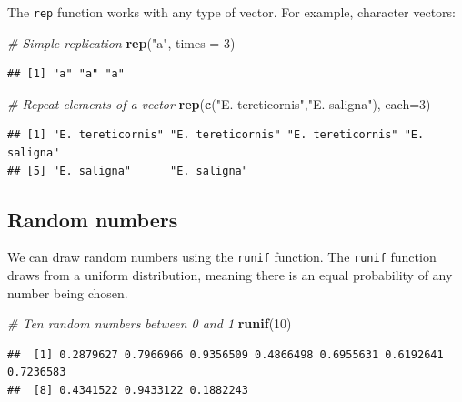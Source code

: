 \documentclass[]{book}
\newenvironment{Shaded}{\begin{snugshade}}{\end{snugshade}}
\newcommand{\CommentTok}[1]{\textcolor[rgb]{0.56,0.35,0.01}{\textit{#1}}}
\newcommand{\DataTypeTok}[1]{\textcolor[rgb]{0.13,0.29,0.53}{#1}}
\newcommand{\DecValTok}[1]{\textcolor[rgb]{0.00,0.00,0.81}{#1}}
\newcommand{\KeywordTok}[1]{\textcolor[rgb]{0.13,0.29,0.53}{\textbf{#1}}}
\newcommand{\NormalTok}[1]{#1}
\newcommand{\StringTok}[1]{\textcolor[rgb]{0.31,0.60,0.02}{#1}}
\begin{document}
The \texttt{rep} function works with any type of vector. For example, character vectors:

\begin{Shaded}
\begin{Highlighting}[]
\CommentTok{# Simple replication}
\KeywordTok{rep}\NormalTok{(}\StringTok{"a"}\NormalTok{, }\DataTypeTok{times =} \DecValTok{3}\NormalTok{)}
\end{Highlighting}
\end{Shaded}

\begin{verbatim}
## [1] "a" "a" "a"
\end{verbatim}

\begin{Shaded}
\begin{Highlighting}[]
\CommentTok{# Repeat elements of a vector}
\KeywordTok{rep}\NormalTok{(}\KeywordTok{c}\NormalTok{(}\StringTok{"E. tereticornis"}\NormalTok{,}\StringTok{"E. saligna"}\NormalTok{), }\DataTypeTok{each=}\DecValTok{3}\NormalTok{)}
\end{Highlighting}
\end{Shaded}

\begin{verbatim}
## [1] "E. tereticornis" "E. tereticornis" "E. tereticornis" "E. saligna"     
## [5] "E. saligna"      "E. saligna"
\end{verbatim}

\hypertarget{randomnumbers}{%
\subsection{Random numbers}\label{randomnumbers}}

We can draw random numbers using the \texttt{runif} function. The \texttt{runif} function draws from a uniform distribution, meaning there is an equal probability of any number being chosen.

\begin{Shaded}
\begin{Highlighting}[]
\CommentTok{# Ten random numbers between 0 and 1}
\KeywordTok{runif}\NormalTok{(}\DecValTok{10}\NormalTok{)}
\end{Highlighting}
\end{Shaded}

\begin{verbatim}
##  [1] 0.2879627 0.7966966 0.9356509 0.4866498 0.6955631 0.6192641 0.7236583
##  [8] 0.4341522 0.9433122 0.1882243
\end{verbatim}
\end{document}
